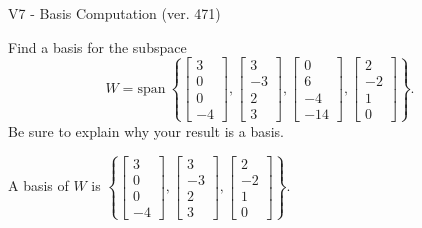 \begin{exercise}
  \begin{exerciseTitle}V7 - Basis Computation (ver. 471)\end{exerciseTitle}
  \begin{exerciseStatement}
    Find a basis for the subspace 
\[W=\mathrm{span}\ \left\{\left[\begin{array}{r}
3 \\
0 \\
0 \\
-4
\end{array}\right] , \left[\begin{array}{r}
3 \\
-3 \\
2 \\
3
\end{array}\right] , \left[\begin{array}{r}
0 \\
6 \\
-4 \\
-14
\end{array}\right] , \left[\begin{array}{r}
2 \\
-2 \\
1 \\
0
\end{array}\right]\right\}.\]
 Be sure to explain why your result is a basis.


  \end{exerciseStatement}
  \begin{exerciseAnswer}
   A basis of \(W\) is  \(\left\{\left[\begin{array}{r}
3 \\
0 \\
0 \\
-4
\end{array}\right] , \left[\begin{array}{r}
3 \\
-3 \\
2 \\
3
\end{array}\right] , \left[\begin{array}{r}
2 \\
-2 \\
1 \\
0
\end{array}\right]\right\}\).
  


  \end{exerciseAnswer}
\end{exercise}